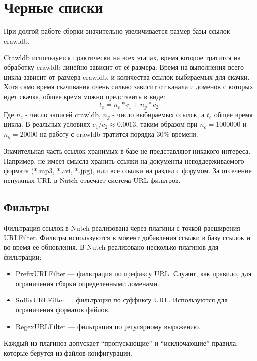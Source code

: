 \section{Черные списки}
При долгой работе сборки значительно увеличивается размер базы ссылок crawldb.

Crawldb используется практически на всех этапах, время которое тратится на обработку crawldb линейно зависит от её размера. Время на выполнения всего цикла зависит от размера crawldb, и количества ссылок выбираемых для скачки. Хотя само время скачивания очень сильно зависит от канала и доменов с которых идет скачка, общее время можно представить в виде:
$$t_{c}=n_{c}*c_{1}+n_{g}*c_{2}$$ Где $n_{c}$ - число записей crawldb, $n_{g}$ - число выбираемых ссылок, а $t_{c}$ общее время цикла. В реальных условиях $c_{1}/c_{2}\approx 0.0013$, таким образом при $n_{c}=1000000$ и $n_{g}=20000$ на работу с crawldb тратится порядка 30\% времени. 

Значительная часть ссылок хранимых в базе не представляют никакого интереса. Например, не имеет смысла хранить ссылки на документы неподдерживаемого формата (*.mp3, *.avi, *.jpg), или все ссылки на раздел с форумом. За отсечение ненужных URL в Nutch отвечает система URL фильтров.

\subsection{Фильтры}
Фильтрация ссылок в Nutch реализована через плагины с точкой расширения URLFilter. Фильтры используются в момент добавления ссылки в базу ссылок и во время её обновления. В Nutch реализовано несколько плагинов для фильтрации:
\begin{itemize}
 \item PrefixURLFilter --- фильтрация по префиксу URL. Служит, как правило, для ограничения сборки определенными доменами.
 \item SuffixURLFilter --- фильтрация по суффиксу URL. Используются для ограничения форматов файлов.
 \item RegexURLFilter --- фильтрация по регулярному выражению. 
\end{itemize}

Каждый из плагинов допускает ``пропускающие'' и ``исключающие'' правила, которые берутся из файлов конфигурации. 

